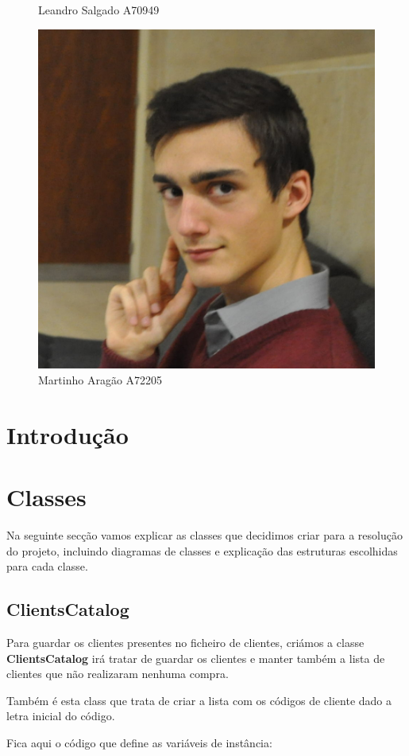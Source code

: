 \documentclass[10pt] {article}
\begin{document}
\begin{figure}[!htb]
  \caption{Leandro Salgado A70949}\label{fig:awesome_image2}
\endminipage\hfill
{}%
  \includegraphics[width=\linewidth]{ma.jpg}
  \caption{Martinho Aragão A72205}
\endminipage
\end{figure}

\newpage

\tableofcontents

\newpage

\section{Introdução}

\newpage
\section{Classes}
Na seguinte secção vamos explicar as classes que decidimos criar para a resolução do projeto, incluindo diagramas
de classes e explicação das estruturas escolhidas para cada classe.

\subsection{ClientsCatalog}
\par Para guardar os clientes presentes no ficheiro de clientes, criámos a classe \textbf{ClientsCatalog} irá tratar de guardar
os clientes e manter também a lista de clientes que não realizaram nenhuma compra.
\par Também é esta class que trata de criar a lista com os códigos de cliente dado a letra inicial do código.
\par Fica aqui o código que define as variáveis de instância:
\end{document}
